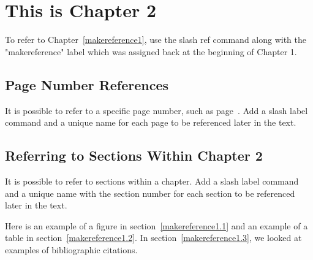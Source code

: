 
\cleardoublepage


\chapter{This is Chapter 2}
\label{makereference2}

To refer to Chapter~\ref{makereference1}, use the slash ref command along with the "makereference" label which was assigned back at the beginning of Chapter 1.

\section{Page Number References}
\label{makereference2.1} It is possible to refer to a specific page
number, such as page~\pageref{makereference1}.  Add a slash label
command and a unique name for each page to be referenced later in
the text.

\section{Referring to Sections Within Chapter 2}
\label{makereference2.2} It is possible to refer to sections within
a chapter.  Add a slash label command and a unique name with the section number for each section to be referenced later in the text.

Here is an example of a figure in section~\ref{makereference1.1} and
an example of a table in section~\ref{makereference1.2}.  In
section~\ref{makereference1.3}, we looked at examples of
bibliographic citations.
